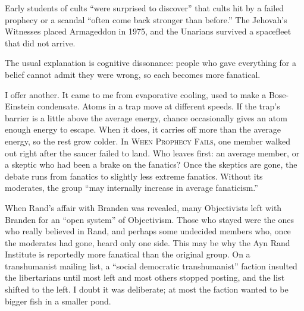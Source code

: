 
Early students of cults ``were surprised to discover'' that cults hit by a failed prophecy or a scandal ``often come back stronger than before.''  The Jehovah's Witnesses placed Armageddon in 1975, and the Unarians survived a spacefleet that did not arrive. 

The usual explanation is cognitive dissonance: people who gave everything for a belief cannot admit they were wrong, so each becomes more fanatical. 

I offer another. It came to me from evaporative cooling, used to make a Bose-Einstein condensate. Atoms in a trap move at different speeds. If the trap's barrier is a little above the average energy, chance occasionally gives an atom enough energy to escape. When it does, it carries off more than the average energy, so the rest grow colder. In \textsc{When Prophecy Fails}, one member walked out right after the saucer failed to land. Who leaves first: an average member, or a skeptic who had been a brake on the fanatics?  Once the skeptics are gone, the debate runs from fanatics to slightly less extreme fanatics. Without its moderates, the group ``may internally increase in average fanaticism.'' 

When Rand's affair with Branden was revealed, many Objectivists left with Branden for an ``open system'' of Objectivism. Those who stayed were the ones who really believed in Rand, and perhaps some undecided members who, once the moderates had gone, heard only one side. This may be why the Ayn Rand Institute is reportedly more fanatical than the original group.  On a transhumanist mailing list, a ``social democratic transhumanist'' faction insulted the libertarians until most left and most others stopped posting, and the list shifted to the left. I doubt it was deliberate; at most the faction wanted to be bigger fish in a smaller pond.

